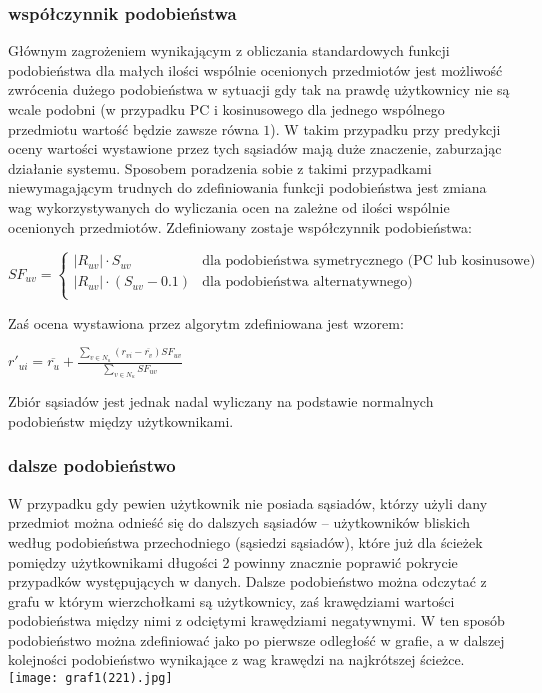 \documentclass{pracamgr}
\begin{document}
    \subsubsection{współczynnik podobieństwa}
     Głównym zagrożeniem wynikającym z obliczania standardowych funkcji podobieństwa dla małych ilości wspólnie ocenionych przedmiotów jest możliwość
     zwrócenia dużego podobieństwa w sytuacji gdy tak na prawdę użytkownicy nie są wcale podobni
     (w przypadku PC i kosinusowego dla jednego wspólnego przedmiotu wartość będzie zawsze równa $1$).
     W takim przypadku przy predykcji oceny wartości wystawione przez tych sąsiadów mają duże znaczenie, zaburzając działanie systemu.
     Sposobem poradzenia sobie z takimi przypadkami niewymagającym trudnych do zdefiniowania funkcji podobieństwa jest zmiana wag
     wykorzystywanych do wyliczania ocen na zależne od ilości wspólnie ocenionych przedmiotów.
     Zdefiniowany zostaje współczynnik podobieństwa:
     \begin{center}
      $SF_{uv}=\left\{\begin{array}{cc}
       |R_{uv}|\cdot S_{uv}&\text{dla podobieństwa symetrycznego (PC lub kosinusowe)}\\
       |R_{uv}|\cdot(S_{uv}-0.1)&\text{dla podobieństwa alternatywnego)}\\
      \end{array}\right.$
     \end{center}
     Zaś ocena wystawiona przez algorytm zdefiniowana jest wzorem:
     \begin{center}
     $r'_{ui}=\overline{r_{u}}+\frac{\sum\limits_{v\in N_u}(r_{vi}-\overline{r_v})SF_{uv}}{\sum\limits_{v\in N_u}SF_{uv}}$
     \end{center}
     Zbiór sąsiadów jest jednak nadal wyliczany na podstawie normalnych podobieństw między użytkownikami.
    \subsubsection{dalsze podobieństwo}
     W przypadku gdy pewien użytkownik nie posiada sąsiadów, którzy użyli dany przedmiot %
     można odnieść się do dalszych sąsiadów -- użytkowników bliskich według podobieństwa przechodniego (sąsiedzi sąsiadów),
     które już dla ścieżek pomiędzy użytkownikami długości 2 powinny znacznie poprawić pokrycie przypadków występujących w danych.%
     Dalsze podobieństwo można odczytać z grafu w którym wierzchołkami są użytkownicy, zaś krawędziami wartości podobieństwa między nimi z odciętymi krawędziami
     negatywnymi. W ten sposób podobieństwo można zdefiniować jako po pierwsze odległość w grafie, a w dalszej kolejności podobieństwo wynikające z wag krawędzi
     na najkrótszej ścieżce.\newline
     \texttt{[image: graf1(221).jpg]}\newline
\end{document}
